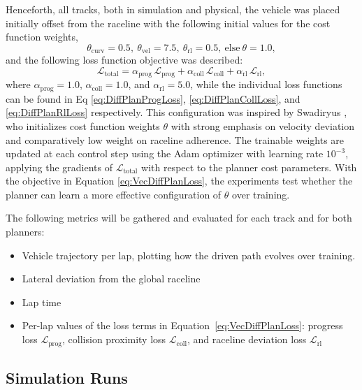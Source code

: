 Henceforth, all tracks, both in simulation and physical, the vehicle was placed initially offset from the raceline with the following initial values for the cost function weights,
\begin{equation*}
    \theta_{\text{curv}} = 0.5, \ \theta_{\text{vel}} = 7.5, \ \theta_{\text{rl}} = 0.5, \ \text{else} \ \theta = 1.0,
\end{equation*}
and the following loss function objective was described:
\begin{equation}
    \mathcal{L}_{\text{total}} = \alpha_{\text{prog}}\,\mathcal{L}_{\text{prog}} + \alpha_{\text{coll}}\,\mathcal{L}_{\text{coll}} + \alpha_{\text{rl}}\,\mathcal{L}_{\text{rl}},
    \label{eq:VecDiffPlanLoss}
\end{equation}
where $\alpha_{\text{prog}} = 1.0$, $\alpha_{\text{coll}} = 1.0$, and $\alpha_{\text{rl}} = 5.0$, while the individual loss functions can be found in Eq \ref{eq:DiffPlanProgLoss}, \ref{eq:DiffPlanCollLoss}, and \ref{eq:DiffPlanRlLoss} respectively.
This configuration was inspired by Swadiryus \cite{swadiryus_DifferentiableMotionPlanning_2025}, who initializes cost function weights $\theta$ with strong emphasis on velocity deviation and comparatively low weight on raceline adherence.
The trainable weights are updated at each control step using the Adam optimizer \cite{kingma_AdamMethodStochastic_2015} with learning rate $10^{-3}$, applying the gradients of $\mathcal{L}_{\text{total}}$ with respect to the planner cost parameters.
With the objective in Equation \ref{eq:VecDiffPlanLoss}, the experiments test whether the planner can learn a more effective configuration of $\theta$ over training.

The following metrics will be gathered and evaluated for each track and for both planners:
\begin{itemize}
    \setlength\itemsep{2pt}
    \item Vehicle trajectory per lap, plotting how the driven path evolves over training.
    \item Lateral deviation from the global raceline
    \item Lap time
    \item Per-lap values of the loss terms in Equation~\ref{eq:VecDiffPlanLoss}: progress loss $\mathcal{L}_{\text{prog}}$, collision proximity loss $\mathcal{L}_{\text{coll}}$, and raceline deviation loss $\mathcal{L}_{\text{rl}}$
\end{itemize}

\subsection{Simulation Runs}

